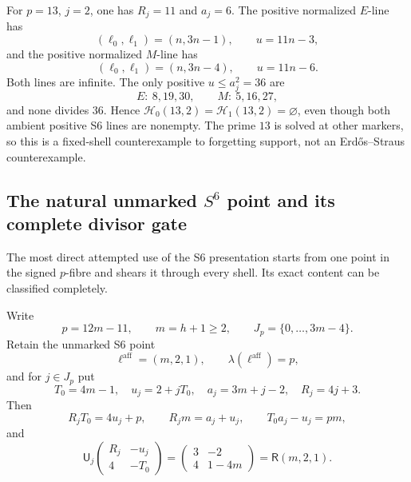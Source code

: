 \begin{example}\label{ex:esksb-ambient}
For \(p=13\), \(j=2\), one has \(R_j=11\) and \(a_j=6\).  The positive
normalized \(E\)-line has
\[
 (\ell_0,\ell_1)=(n,3n-1),
 \qquad u=11n-3,
\]
and the positive normalized \(M\)-line has
\[
 (\ell_0,\ell_1)=(n,3n-4),
 \qquad u=11n-6.
\]
Both lines are infinite.  The only positive \(u\leq a_j^2=36\) are
\[
 E:\ 8,19,30,
 \qquad M:\ 5,16,27,
\]
and none divides \(36\).  Hence
\(\mathcal H_0(13,2)=\mathcal H_1(13,2)=\varnothing\), even though both
ambient positive S6 lines are nonempty.  The prime \(13\) is solved at other
markers, so this is a fixed-shell counterexample to forgetting support, not
an Erd\H{o}s--Straus counterexample.
\end{example}

\subsection{The natural unmarked \texorpdfstring{\(S^6\)}{S6} point and its complete divisor gate}

The most direct attempted use of the S6 presentation starts from one point in
the signed \(p\)-fibre and shears it through every shell.  Its exact content
can be classified completely.

Write
\begin{equation}
 p=12m-11,
 \qquad m=h+1\geq2,
 \qquad J_p=\{0,\ldots,3m-4\}.                              \tag{6.1}
\end{equation}
Retain the unmarked S6 point
\begin{equation}
 \ell^{\mathrm{aff}}=(m,2,1),
 \qquad \lambda(\ell^{\mathrm{aff}})=p,                     \tag{6.2}
\end{equation}
and for \(j\in J_p\) put
\begin{equation}
 T_0=4m-1,
 \quad u_j=2+jT_0,
 \quad a_j=3m+j-2,
 \quad R_j=4j+3.                                             \tag{6.3}
\end{equation}
Then
\begin{equation}
 R_jT_0=4u_j+p,
 \qquad R_jm=a_j+u_j,
 \qquad T_0a_j-u_j=pm,                                      \tag{6.4}
\end{equation}
and
\begin{equation}
 \mathsf U_j
 \begin{pmatrix}R_j&-u_j\\4&-T_0\end{pmatrix}
 =
 \begin{pmatrix}3&-2\\4&1-4m\end{pmatrix}
 =\mathsf R(m,2,1).                                         \tag{6.5}
\end{equation}

